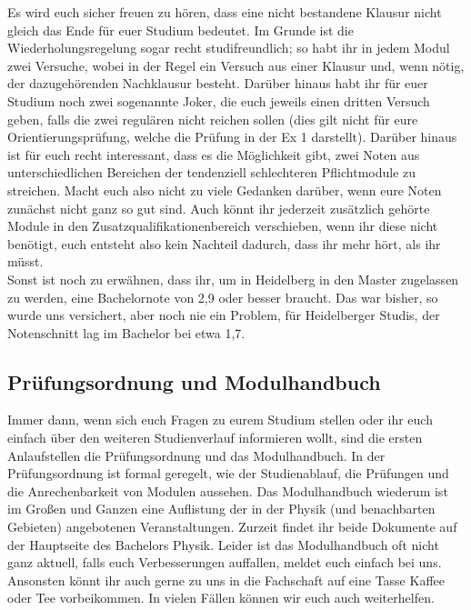 Es wird euch sicher freuen zu hören, dass eine nicht bestandene Klausur nicht gleich das Ende für euer Studium bedeutet. Im Grunde ist die Wiederholungsregelung sogar recht studifreundlich; so habt ihr in jedem Modul zwei Versuche, wobei in der Regel ein Versuch aus einer Klausur und, wenn nötig, der dazugehörenden Nachklausur besteht. Darüber hinaus habt ihr für euer Studium noch zwei sogenannte Joker, die euch jeweils einen dritten Versuch geben, falls die zwei regulären nicht reichen sollen (dies gilt nicht für eure Orientierungsprüfung, welche die Prüfung in der Ex 1 darstellt). Darüber hinaus ist für euch recht interessant, dass es die Möglichkeit gibt, zwei Noten aus unterschiedlichen Bereichen der tendenziell schlechteren Pflichtmodule zu streichen. Macht euch also nicht zu viele Gedanken darüber, wenn eure Noten zunächst nicht ganz so gut sind. Auch könnt ihr jederzeit zusätzlich gehörte Module in den Zusatzqualifikationenbereich verschieben, wenn ihr diese nicht benötigt, euch entsteht also kein Nachteil dadurch, dass ihr mehr hört, als ihr müsst.\\

Sonst ist noch zu erwähnen, dass ihr, um in Heidelberg in den Master zugelassen zu werden, eine Bachelornote von 2,9 oder besser braucht. Das war bisher, so wurde uns versichert, aber noch nie ein Problem, für Heidelberger Studis, der Notenschnitt lag im Bachelor bei etwa 1,7. %

\subsection{Prüfungsordnung und Modulhandbuch}

\begin{figure}[b]
\end{figure}

Immer dann, wenn sich euch Fragen zu eurem Studium stellen oder ihr euch einfach über den weiteren Studienverlauf informieren wollt, sind die ersten Anlaufstellen die Prüfungsordnung und das Modulhandbuch. In der Prüfungsordnung ist formal geregelt, wie der Studienablauf, die Prüfungen und die Anrechenbarkeit von Modulen aussehen. Das Modulhandbuch wiederum ist im Großen und Ganzen eine Auflistung der in der Physik (und benachbarten Gebieten) angebotenen Veranstaltungen. Zurzeit findet ihr beide Dokumente auf der Hauptseite des Bachelors Physik. Leider ist das Modulhandbuch oft nicht ganz aktuell, falls euch Verbesserungen auffallen, meldet euch einfach bei uns.\\

Ansonsten könnt ihr auch gerne zu uns in die Fachschaft auf eine Tasse Kaffee oder Tee vorbeikommen. In vielen Fällen können wir euch auch weiterhelfen.

